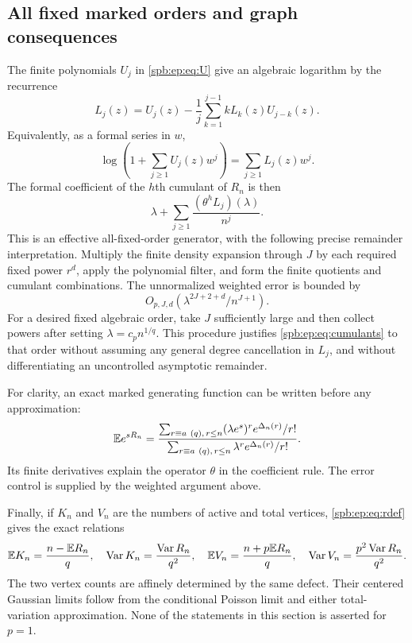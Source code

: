 \subsection{All fixed marked orders and graph consequences}
The finite polynomials $U_j$ in \eqref{spb:ep:eq:U} give an algebraic logarithm
by the recurrence
\begin{equation}\label{spb:ep:eq:Lrec}
 L_j(z)=U_j(z)-\frac1j\sum_{k=1}^{j-1}kL_k(z)U_{j-k}(z).
\end{equation}
Equivalently, as a formal series in $w$,
\[
 \log\left(1+\sum_{j\ge1}U_j(z)w^j\right)
                      =\sum_{j\ge1}L_j(z)w^j.
\]
The formal coefficient of the $h$th cumulant of $R_n$ is then
\begin{equation}\label{spb:ep:eq:cumulants}
 \lambda+\sum_{j\ge1}\frac{(\theta^hL_j)(\lambda)}{n^j}.
\end{equation}
This is an effective all-fixed-order generator, with the following precise
remainder interpretation. Multiply the finite density expansion through
$J$ by each required fixed power $r^d$, apply the polynomial filter, and
form the finite quotients and cumulant combinations. The unnormalized
weighted error is bounded by
\[
 O_{p,J,d}(\lambda^{2J+2+d}/n^{J+1}).
\]
For a desired fixed algebraic order, take $J$ sufficiently large and then
collect powers after setting $\lambda=c_p n^{1/q}$.
This procedure justifies \eqref{spb:ep:eq:cumulants} to that order without
assuming any general degree cancellation in $L_j$, and without
differentiating an uncontrolled asymptotic remainder.

For clarity, an exact marked generating function can be written before
any approximation:
\[
 \mathbb E e^{sR_n}=
 \frac{\sum_{r\equiv a\ (q),\,r\le n}(\lambda e^s)^r e^{\Delta_n(r)}/r!}
      {\sum_{r\equiv a\ (q),\,r\le n}\lambda^r e^{\Delta_n(r)}/r!}.
\]
Its finite derivatives explain the operator $\theta$ in the coefficient
rule. The error control is supplied by the weighted argument above.

Finally, if $K_n$ and $V_n$ are the numbers of active and total vertices,
\eqref{spb:ep:eq:rdef} gives the exact relations
\[
 \mathbb E K_n=\frac{n-\mathbb E R_n}{q},\quad
 \operatorname{Var} K_n=\frac{\operatorname{Var} R_n}{q^2},\quad
 \mathbb E V_n=\frac{n+p\mathbb E R_n}{q},\quad
 \operatorname{Var} V_n=\frac{p^2\operatorname{Var} R_n}{q^2}.
\]
The two vertex counts are affinely determined by the same defect.
Their centered Gaussian limits follow from the conditional Poisson limit
and either total-variation approximation. None of the statements in
this section is asserted for $p=1$.
